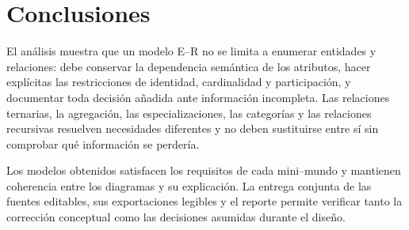 \section{Conclusiones}

El análisis muestra que un modelo E--R no se limita a enumerar entidades y
relaciones: debe conservar la dependencia semántica de los atributos, hacer
explícitas las restricciones de identidad, cardinalidad y participación, y
documentar toda decisión añadida ante información incompleta. Las relaciones
ternarias, la agregación, las especializaciones, las categorías y las
relaciones recursivas resuelven necesidades diferentes y no deben sustituirse
entre sí sin comprobar qué información se perdería.

Los modelos obtenidos satisfacen los requisitos de cada mini--mundo y mantienen
coherencia entre los diagramas y su explicación. La entrega conjunta de las
fuentes editables, sus exportaciones legibles y el reporte permite verificar
tanto la corrección conceptual como las decisiones asumidas durante el diseño.
